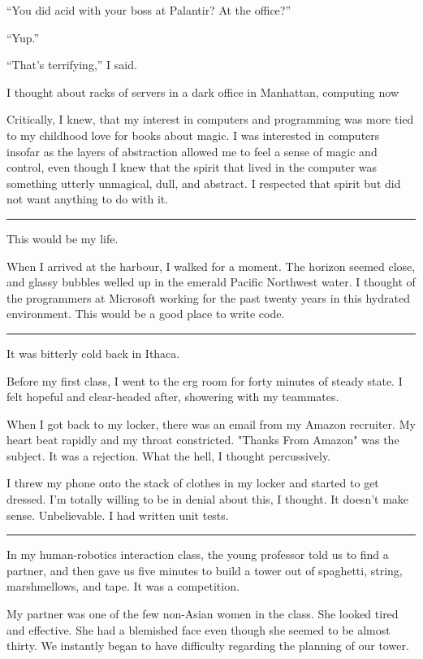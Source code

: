 ``You did acid with your boss at Palantir?  At the office?''

``Yup.''

``That's terrifying,'' I said.

I thought about racks of servers in a dark office in Manhattan, computing now

Critically, I knew, that my interest in computers and programming was more tied
to my childhood love for books about magic.  I was interested in computers
insofar as the layers of abstraction allowed me to feel a sense of magic and
control, even though I knew that the spirit that lived in the computer was
something utterly unmagical, dull, and abstract.  I respected that spirit but
did not want anything to do with it.  

\plainfancybreak{12pt}{2}{* * *}

This would be my life.

When I arrived at the harbour, I walked for a moment.  The horizon seemed close,
and glassy bubbles welled up in the emerald Pacific Northwest water.  I thought
of the programmers at Microsoft working for the past twenty years in this
hydrated environment.  This would be a good place to write code.

\plainfancybreak{12pt}{2}{* * *}

It was bitterly cold back in Ithaca.

Before my first class, I went to the erg room for forty minutes of steady state.
I felt hopeful and clear-headed after, showering with my teammates.

When I got back to my locker, there was an email from my Amazon recruiter.  My
heart beat rapidly and my throat constricted.  "Thanks From Amazon" was the
subject.  It was a rejection.  What the hell, I thought percussively. 

I threw my phone onto the stack of clothes in my locker and started to get
dressed.  I'm totally willing to be in denial about this, I thought.  It doesn't
make sense.  Unbelievable.  I had written unit tests.

\plainfancybreak{12pt}{2}{* * *}

In my human-robotics interaction class, the young professor told us to find a
partner, and then gave us five minutes to build a tower out of spaghetti,
string, marshmellows, and tape.  It was a competition.

My partner was one of the few non-Asian women in the class.  She looked tired
and effective.  She had a blemished face even though she seemed to be almost
thirty.  We instantly began to have difficulty regarding the planning of our
tower.  

